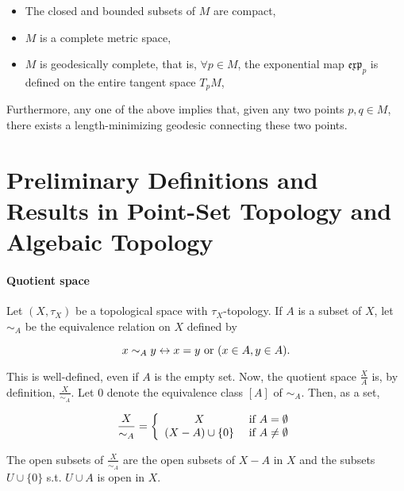 \begin{itemize}
    \item The closed and bounded subsets of $M$ are compact,
    \item $M$ is a complete metric space, 
    \item $M$ is geodesically complete, that is, $\forall p \in M$, the exponential map $\mathfrak{e}\mathfrak{x}\mathfrak{p}_{p}$ is defined on the entire tangent space $T_p M$,
\end{itemize}

Furthermore, any one of the above implies that, given any two points $p, q \in M$, there exists a length-minimizing geodesic connecting these two points. \\

\section{Preliminary Definitions and Results in Point-Set Topology and Algebaic Topology}

\paragraph{Quotient space}

\begin{df}

Let $(X, \tau_X)$ be a topological space with $\tau_X$-topology. If $A$ is a subset of $X$, let $\sim_A$ be the equivalence relation on $X$ defined by 

$$
    x \sim_A y \leftrightarrow x=y \textnormal{ or } (x \in A, y \in A).
$$

This is well-defined, even if $A$ is the empty set. Now, the quotient space $\frac{X}{A}$ is, by definition, $\frac{X}{\sim_A}$. Let $0$ denote the equivalence class $[A]$ of $\sim_A$. Then, as a set,

\begin{equation*}
    \frac{X}{\sim_A} = \left\{
         \begin{array}{cc}
              X & \textnormal{ if } A = \emptyset \\
              (X-A) \cup \{0\} & \textnormal{ if } A \neq \emptyset
         \end{array}
    \right.
\end{equation*}

\end{df}

The open subsets of $\frac{X}{\sim_A}$ are the open subsets of $X-A$ in $X$ and the subsets $U \cup \{0\}$ s.t. $U \cup A$ is open in $X$.

\clearpage
